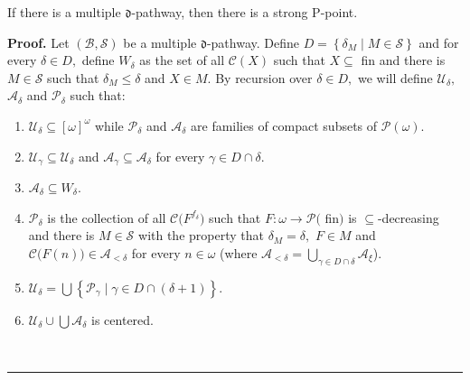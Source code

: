 \documentclass[10pt,a4paper]{amsart}
\newenvironment{proof}[1][Proof]{\noindent\textbf{#1.} }{\ \rule{0.5em}{0.5em}}
\begin{document}
\begin{theorem}
If there is a multiple $\mathfrak{d}$-pathway, then there is a strong
\textsf{P}-point. \label{Teorema Strong}
\end{theorem}

\begin{proof}
Let $\left(  \mathcal{B},\mathcal{S}\right)  $ be a multiple $\mathfrak{d}%
$-pathway. Define $D=\left\{  \delta_{M}\mid M\in\mathcal{S}\right\}  $ and
for every $\delta\in D,$ define $W_{\delta}$ as the set of all $\mathcal{C}%
\left(  X\right)  $ such that $X\subseteq$ \textsf{fin }and there is
$M\in\mathcal{S}$ such that $\delta_{M}\leq\delta$ and $X\in M.$ By recursion
over $\delta\in D,$ we will define $\mathcal{U}_{\delta},$ $\mathcal{A}%
_{\delta}$ and $\mathcal{P}_{\delta}$ such that:

\begin{enumerate}
\item $\mathcal{U}_{\delta}\subseteq\left[  \omega\right]  ^{\omega}$ while
$\mathcal{P}_{\delta}$ and $\mathcal{A}_{\delta}$ are families of compact
subsets of $\mathcal{P}\left(  \omega\right)  .$

\item $\mathcal{U}_{\gamma}\subseteq\mathcal{U}_{\delta}$ and $\mathcal{A}%
_{\gamma}\subseteq\mathcal{A}_{\delta}$ for every $\gamma\in D\cap\delta.$

\item $\mathcal{A}_{\delta}\subseteq W_{\delta}.$

\item $\mathcal{P}_{\delta}$ is the collection of all $\mathcal{C(}%
F^{f_{\delta}})$ such that $F:\omega\longrightarrow\mathcal{P(}$%
\textsf{fin}$)$\textsf{ is }$\subseteq$-decreasing and there is $M\in
\mathcal{S}$ with the property that $\delta_{M}=\delta,$ $F\in M$ and
$\mathcal{C(}F\left(  n\right)  )\in\mathcal{A}_{<\delta}$ for every
$n\in\omega$ (where $\mathcal{A}_{<\delta}=%
{\textstyle\bigcup\limits_{\gamma\in D\cap\delta}}
\mathcal{A}_{\xi}$).

\item $\mathcal{U}_{\delta}=%
{\textstyle\bigcup}
\left\{  \mathcal{P}_{\gamma}\mid\gamma\in D\cap\left(  \delta+1\right)
\right\}  .$

\item $\mathcal{U}_{\delta}\cup%
{\textstyle\bigcup}
\mathcal{A}_{\delta}$ is centered.


\end{enumerate}
\end{proof}
\end{document}
